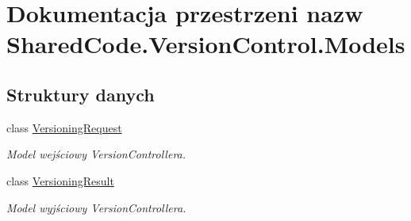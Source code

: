 \hypertarget{a00319}{}\section{Dokumentacja przestrzeni nazw Shared\+Code.\+Version\+Control.\+Models}
\label{a00319}
\subsection*{Struktury danych}
\begin{DoxyCompactItemize}
\item 
class \hyperlink{a00084}{Versioning\+Request}
\begin{DoxyCompactList}\small\item\em Model wejściowy Version\+Controllera. \end{DoxyCompactList}\item 
class \hyperlink{a00085}{Versioning\+Result}
\begin{DoxyCompactList}\small\item\em Model wyjściowy Version\+Controllera. \end{DoxyCompactList}\end{DoxyCompactItemize}
